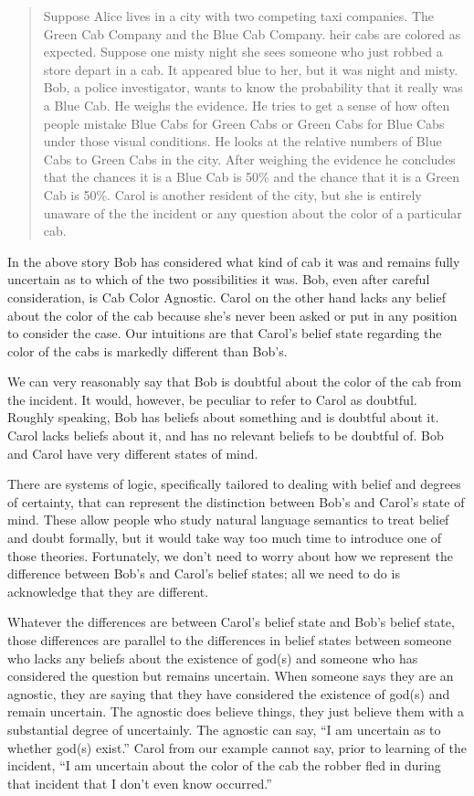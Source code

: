 \documentclass[12pt]{article}
\begin{document}
\begin{quote}
Suppose Alice lives in a city with two competing taxi companies.
The Green Cab Company and the Blue Cab Company. 
heir cabs are colored as expected. Suppose one misty night she sees someone who just robbed a store depart in a cab.
It appeared blue to her, but it was night and misty.
Bob, a police investigator, wants to know the probability that it really was a Blue Cab.
He weighs the evidence. He tries to get a sense of how often people mistake Blue Cabs for Green Cabs or Green Cabs for Blue Cabs under those visual conditions. He looks at the relative numbers of Blue Cabs to Green Cabs in the city.
After weighing the evidence he concludes that the chances it is a Blue Cab is 50\% and the chance that it is a Green Cab is 50\%.
Carol is another resident of the city, but she is entirely unaware of the the incident or any question about the color of a particular cab.
\end{quote}

In the above story Bob has considered what kind of cab it was and remains fully uncertain as to which of the two possibilities it was.
Bob, even after careful consideration, is Cab Color Agnostic.
Carol on the other hand lacks any belief about the color of the cab because she's never been asked or put in any position to consider the case.
Our intuitions are that Carol's belief state regarding the color of the cabs is markedly different than Bob's. 

We can very reasonably say that Bob is doubtful about the color of the cab from the incident. It would, however, be peculiar to refer to Carol as doubtful. Roughly speaking, Bob has beliefs about something and is doubtful about it. Carol lacks beliefs about it, and has no relevant beliefs to be doubtful of.
Bob and Carol have very different states of mind.

There are systems of logic, specifically tailored to dealing with belief and degrees of certainty, that can represent the distinction between Bob's and Carol's state of mind.
These allow people who study natural language semantics to treat belief and doubt formally, but it would take way too much time to introduce one of those theories.
Fortunately, we don't need to worry about how we represent the difference between Bob's and Carol's belief states;
all we need to do is acknowledge that they are different.

Whatever the differences are between Carol's belief state and Bob's belief state, those differences are parallel to the differences in belief states between someone who lacks any beliefs about the existence of god(s) and someone who has considered the question but remains uncertain.
When someone says they are an agnostic, they are saying that they have considered the existence of god(s) and remain uncertain.
The agnostic does believe things, they just believe them with a substantial degree of uncertainly. The agnostic can say, “I am uncertain as to whether god(s) exist.”
Carol from our example cannot say, prior to learning of the incident, “I am uncertain about the color of the cab the robber fled in during that incident that I don't even know occurred.”
\end{document}
